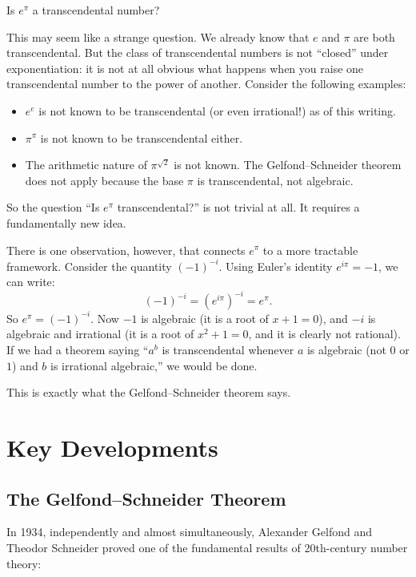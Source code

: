 \begin{problem_statement}
Is $e^\pi$ a transcendental number?
\end{problem_statement}

This may seem like a strange question. We already know that $e$ and $\pi$ are both transcendental. But the class of transcendental numbers is not ``closed'' under exponentiation: it is not at all obvious what happens when you raise one transcendental number to the power of another. Consider the following examples:

\begin{itemize}
    \item $e^e$ is not known to be transcendental (or even irrational!) as of this writing.
    \item $\pi^\pi$ is not known to be transcendental either.
    \item The arithmetic nature of $\pi^{\sqrt{2}}$ is not known. The Gelfond--Schneider theorem does not apply because the base $\pi$ is transcendental, not algebraic.
\end{itemize}

So the question ``Is $e^\pi$ transcendental?'' is not trivial at all. It requires a fundamentally new idea.

There is one observation, however, that connects $e^\pi$ to a more tractable framework. Consider the quantity $(-1)^{-i}$. Using Euler's identity $e^{i\pi} = -1$, we can write:
\[
    (-1)^{-i} = \left(e^{i\pi}\right)^{-i} = e^{\pi}.
\]
So $e^\pi = (-1)^{-i}$. Now $-1$ is algebraic (it is a root of $x + 1 = 0$), and $-i$ is algebraic and irrational (it is a root of $x^2 + 1 = 0$, and it is clearly not rational). If we had a theorem saying ``$a^b$ is transcendental whenever $a$ is algebraic (not $0$ or $1$) and $b$ is irrational algebraic,'' we would be done.

This is exactly what the Gelfond--Schneider theorem says.

\section{Key Developments}

\subsection{The Gelfond--Schneider Theorem}

In 1934, independently and almost simultaneously, Alexander Gelfond and Theodor Schneider proved one of the fundamental results of 20th-century number theory:

